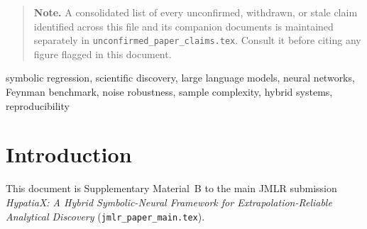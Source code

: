 \documentclass[twoside,11pt]{article}
\begin{document}
\begin{quote}\small
\textbf{Note.} A consolidated list of every unconfirmed, withdrawn, or
stale claim identified across this file and its companion documents is
maintained separately in \texttt{unconfirmed\_paper\_claims.tex}. Consult
it before citing any figure flagged in this document.
\end{quote}


\begin{keywords}
symbolic regression, scientific discovery, large language models,
neural networks, Feynman benchmark, noise robustness, sample complexity,
hybrid systems, reproducibility
\end{keywords}

\section{Introduction}
\label{suppb:intro}

This document is Supplementary Material~B to the main JMLR submission
\emph{HypatiaX: A Hybrid Symbolic-Neural Framework for Extrapolation-Reliable
Analytical Discovery} (\texttt{jmlr\_paper\_main.tex}).
\end{document}
